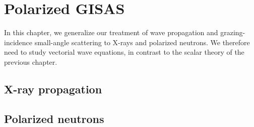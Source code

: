 
\chapter{Polarized GISAS}  \label{SPol}

In this chapter,
we generalize our treatment of wave propagation and
grazing-incidence small-angle scattering
to X-rays and polarized neutrons.
We therefore need to study vectorial wave equations,
in contrast to the scalar theory of the previous chapter.

\section{X-ray propagation}\label{Sxray}

\MissingSection


\section{Polarized neutrons}\label{Snpol}


\MissingSection

